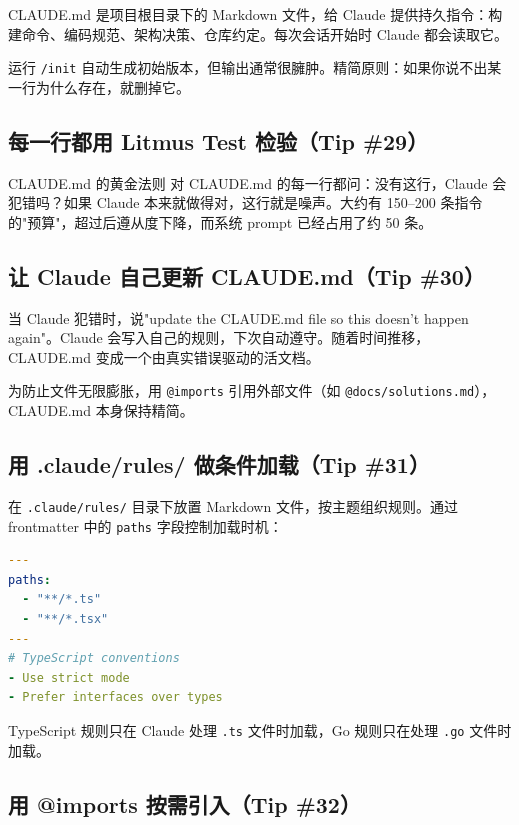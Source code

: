 \documentclass[a4paper]{article}
\begin{document}
CLAUDE.md 是项目根目录下的 Markdown 文件，给 Claude 提供持久指令：构建命令、编码规范、架构决策、仓库约定。每次会话开始时 Claude 都会读取它。

运行 \texttt{/init} 自动生成初始版本，但输出通常很臃肿。精简原则：如果你说不出某一行为什么存在，就删掉它。

\subsection{每一行都用 Litmus Test 检验（Tip \#29）}

\begin{importantbox}{CLAUDE.md 的黄金法则}
对 CLAUDE.md 的每一行都问：没有这行，Claude 会犯错吗？如果 Claude 本来就做得对，这行就是噪声。大约有 150--200 条指令的"预算"，超过后遵从度下降，而系统 prompt 已经占用了约 50 条。
\end{importantbox}

\subsection{让 Claude 自己更新 CLAUDE.md（Tip \#30）}

当 Claude 犯错时，说"update the CLAUDE.md file so this doesn't happen again"。Claude 会写入自己的规则，下次自动遵守。随着时间推移，CLAUDE.md 变成一个由真实错误驱动的活文档。

为防止文件无限膨胀，用 \texttt{@imports} 引用外部文件（如 \texttt{@docs/solutions.md}），CLAUDE.md 本身保持精简。

\subsection{用 .claude/rules/ 做条件加载（Tip \#31）}

在 \texttt{.claude/rules/} 目录下放置 Markdown 文件，按主题组织规则。通过 frontmatter 中的 \texttt{paths} 字段控制加载时机：

\begin{lstlisting}[caption={条件加载规则示例}, language=yaml]
---
paths:
  - "**/*.ts"
  - "**/*.tsx"
---
# TypeScript conventions
- Use strict mode
- Prefer interfaces over types
\end{lstlisting}

TypeScript 规则只在 Claude 处理 \texttt{.ts} 文件时加载，Go 规则只在处理 \texttt{.go} 文件时加载。

\subsection{用 @imports 按需引入（Tip \#32）}
\end{document}
